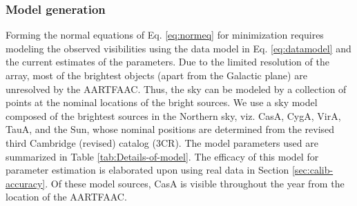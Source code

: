 \documentclass[referee]{aa}
\begin{document}
\subsubsection{\label{sub:Model-generation}Model generation}
\begin{table}[tbh]
\caption{Details of model sources (the A-team) used for all-sky self-calibration.}
\label{tab:Details-of-model}
\end{table}

Forming the  normal equations of  Eq. \ref{eq:normeq} for  minimization requires
modeling    the    observed   visibilities    using    the    data   model    in
Eq. \ref{eq:datamodel} and the current  estimates of the parameters.  Due to the
limited resolution of  the array, most of the brightest  objects (apart from the
Galactic plane) are unresolved by the AARTFAAC.  Thus, the sky can be modeled by
a collection of points at the nominal  locations of the bright sources. We use a
sky model  composed of the  brightest sources in  the Northern sky,  viz.  CasA,
CygA, VirA,  TauA, and the Sun,  whose nominal positions are  determined from the
revised third Cambridge (revised) catalog  (3CR).  The model parameters used are
summarized in Table \ref{tab:Details-of-model}.   The efficacy of this model for
parameter   estimation  is   elaborated  upon   using  real   data   in  Section
\ref{sec:calib-accuracy}.  Of  these model  sources, CasA is  visible throughout
the year from the location of the AARTFAAC.
\end{document}

